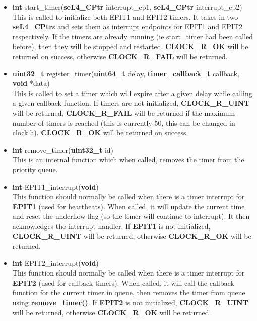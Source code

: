 \documentclass[12pt]{article}
\begin{document}
\begin{itemize}
\item \textbf{int} start\_timer(\textbf{seL4\_CPtr} interrupt\_ep1, \textbf{seL4\_CPtr} interrupt\_ep2)\\
This is called to initialize both EPIT1 and EPIT2 timers. It takes in two \textbf{seL4\_CPtr}s and sets them as interrupt endpoints for EPIT1 and EPIT2 respectively. If the timers are already running (ie start\_timer had been called before), then they will be stopped and restarted. \textbf{CLOCK\_R\_OK} will be returned on success, otherwise \textbf{CLOCK\_R\_FAIL} will be returned.

\item \textbf{uint32\_t} register\_timer(\textbf{uint64\_t} delay, \textbf{timer\_callback\_t} callback, \textbf{void} *data)\\
This is called to set a timer which will expire after a given delay while calling a given callback function. If timers are not initialized, \textbf{CLOCK\_R\_UINT} will be returned, \textbf{CLOCK\_R\_FAIL} will be returned if the maximum number of timers is reached (this is currently 50, this can be changed in clock.h). \textbf{CLOCK\_R\_OK} will be returned on success.

\item \textbf{int} remove\_timer(\textbf{uint32\_t} id)\\
This is an internal function which when called, removes the timer from the priority queue.

\item \textbf{int} EPIT1\_interrupt(\textbf{void})\\
This function should normally be called when there is a timer interrupt for \textbf{EPIT1} (used for heartbeats). When called, it will update the current time and reset the underflow flag (so the timer will continue to interrupt). It then acknowledges the interrupt handler. If \textbf{EPIT1} is not initialized, \textbf{CLOCK\_R\_UINT} will be returned, otherwise \textbf{CLOCK\_R\_OK} will be returned.

\item \textbf{int} EPIT2\_interrupt(\textbf{void})\\
This function should normally be called when there is a timer interrupt for \textbf{EPIT2} (used for callback timers). When called, it will call the callback function for the current timer in queue, then removes the timer from queue using \textbf{remove\_timer()}. If \textbf{EPIT2} is not initialized, \textbf{CLOCK\_R\_UINT} will be returned, otherwise \textbf{CLOCK\_R\_OK} will be returned.


\end{itemize}
\end{document}
